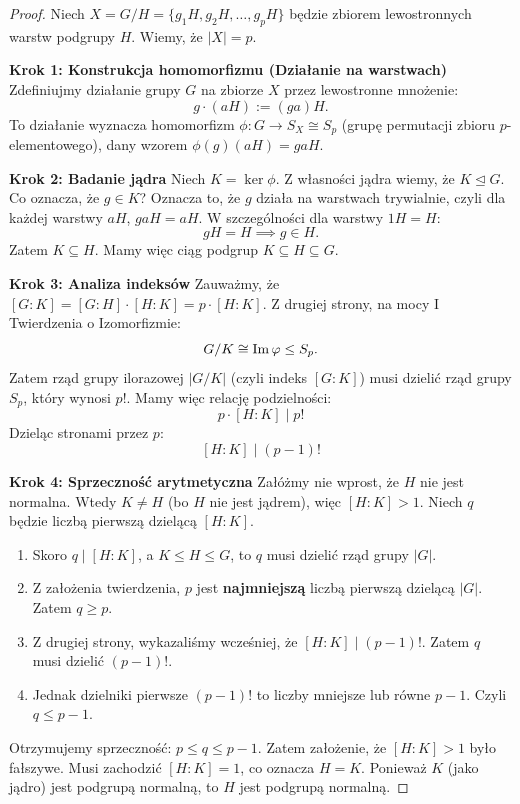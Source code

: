 \begin{proof}
Niech $X = G/H = \{g_1H, g_2H, \dots, g_pH\}$ będzie zbiorem lewostronnych warstw podgrupy $H$. Wiemy, że $|X| = p$.

\textbf{Krok 1: Konstrukcja homomorfizmu (Działanie na warstwach)}
Zdefiniujmy działanie grupy $G$ na zbiorze $X$ przez lewostronne mnożenie:
\[ g \cdot (aH) := (ga)H. \]
To działanie wyznacza homomorfizm $\phi: G \to S_X \cong S_p$ (grupę permutacji zbioru $p$-elementowego), dany wzorem $\phi(g)(aH) = gaH$.

\textbf{Krok 2: Badanie jądra}
Niech $K = \ker \phi$. Z własności jądra wiemy, że $K \trianglelefteq G$.
Co oznacza, że $g \in K$? Oznacza to, że $g$ działa na warstwach trywialnie, czyli dla każdej warstwy $aH$, $gaH = aH$.
W szczególności dla warstwy $1H = H$:
\[ gH = H \implies g \in H. \]
Zatem $K \subseteq H$. Mamy więc ciąg podgrup $K \subseteq H \subseteq G$.

\textbf{Krok 3: Analiza indeksów}
Zauważmy, że $[G:K] = [G:H] \cdot [H:K] = p \cdot [H:K]$.
Z drugiej strony, na mocy I Twierdzenia o Izomorfizmie:
\[ G/K \cong \operatorname{Im} \varphi \le S_p. \]
Zatem rząd grupy ilorazowej $|G/K|$ (czyli indeks $[G:K]$) musi dzielić rząd grupy $S_p$, który wynosi $p!$.
Mamy więc relację podzielności:
\[ p \cdot [H:K] \mid p! \]
Dzieląc stronami przez $p$:
\[ [H:K] \mid (p-1)! \]

\textbf{Krok 4: Sprzeczność arytmetyczna}
Załóżmy nie wprost, że $H$ nie jest normalna. Wtedy $K \neq H$ (bo $H$ nie jest jądrem), więc $[H:K] > 1$.
Niech $q$ będzie liczbą pierwszą dzielącą $[H:K]$.
\begin{enumerate}
    \item Skoro $q \mid [H:K]$, a $K \le H \le G$, to $q$ musi dzielić rząd grupy $|G|$.
    \item Z założenia twierdzenia, $p$ jest \textbf{najmniejszą} liczbą pierwszą dzielącą $|G|$. Zatem $q \ge p$.
    \item Z drugiej strony, wykazaliśmy wcześniej, że $[H:K] \mid (p-1)!$. Zatem $q$ musi dzielić $(p-1)!$.
    \item Jednak dzielniki pierwsze $(p-1)!$ to liczby mniejsze lub równe $p-1$. Czyli $q \le p-1$.
\end{enumerate}
Otrzymujemy sprzeczność: $p \le q \le p-1$.
Zatem założenie, że $[H:K] > 1$ było fałszywe. Musi zachodzić $[H:K] = 1$, co oznacza $H = K$.
Ponieważ $K$ (jako jądro) jest podgrupą normalną, to $H$ jest podgrupą normalną.
\end{proof}

